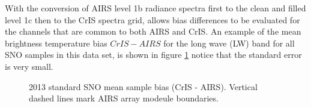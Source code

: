 \documentclass[11pt]{article}
\begin{document}


With the conversion of AIRS level 1b radiance spectra first to the clean and filled level 1c
then to the CrIS spectra grid, allows bias differences to be evaluated for the
channels that are common to both AIRS and CrIS. An example of the mean brightness
temperature bias $ CrIS-AIRS $ for the long wave (LW) band for all SNO samples in this
data set, is shown in figure \ref{fig:Y6} notice that the standard error is very small.

\begin{figure}[htb]
  \centering
  \quad
  \caption{\label{fig:orgparagraph15}
    2013 standard SNO mean sample bias (CrIS - AIRS). Vertical dashed lines mark AIRS array modeule boundaries.}
  \label{fig:Y6}
\end{figure}
\end{document}
